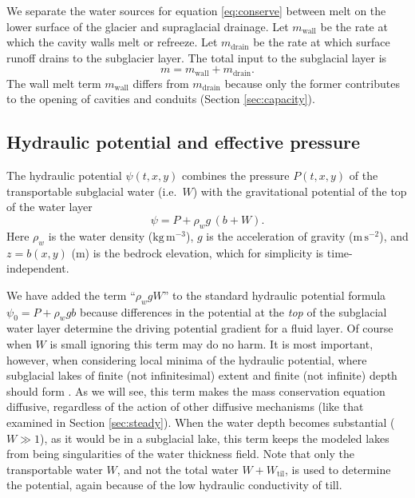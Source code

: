 \documentclass[gmd]{copernicus}   %
\newcommand{\text}{\textrm}
\newcommand{\Wtil}{W_{\text{til}}}
\begin{document}
We separate the water sources for equation \eqref{eq:conserve} between melt on the lower surface of the glacier and supraglacial drainage.  Let $m_{\text{wall}}$ be the rate at which the cavity walls melt or refreeze.  Let $m_{\text{drain}}$ be the rate at which surface runoff drains to the subglacier layer.  The total input to the subglacial layer is
\newcommand{\mwall}{m_{\text{wall}}}
\newcommand{\mdrain}{m_{\text{drain}}}
\begin{equation}
m = \mwall + \mdrain. \label{eq:totalinput}
\end{equation}
The wall melt term $\mwall$ differs from $\mdrain$ because only the former contributes to the opening of cavities and conduits (Section \ref{sec:capacity}).

\subsection{Hydraulic potential and effective pressure}  The  hydraulic potential $\psi(t,x,y)$ combines the pressure $P(t,x,y)$ of the transportable subglacial water (i.e.~$W$) with the gravitational potential of the top of the water layer \citep{Goelleretal2013,Hewittetal2012}
\begin{equation} \label{eq:potential}
\psi = P + \rho_w g\, (b+W).
\end{equation}
Here $\rho_w$ is the water density ($\text{kg}\,\text{m}^{-3}$), $g$ is the acceleration of gravity ($\text{m}\,\text{s}^{-2}$), and $z=b(x,y)$ ($\text{m}$) is the bedrock elevation, which for simplicity is time-independent.

We have added the term ``$\rho_w g W$'' to the standard hydraulic potential formula $\psi_0 = P + \rho_w g b$ \citep{Clarke05,Shreve1972} because differences in the potential at the \emph{top} of the subglacial water layer determine the driving potential gradient for a fluid layer.  Of course when $W$ is small ignoring this term may do no harm.  It is most important, however, when considering local minima of the hydraulic potential, where subglacial lakes of finite (not infinitesimal) extent and finite (not infinite) depth should form \citep[compare][]{Siegertetal2009}.  As we will see, this term makes the mass conservation equation diffusive, regardless of the action of other diffusive mechanisms (like that examined in Section \ref{sec:steady}).  When the water depth becomes substantial ($W\gg 1$), as it would be in a subglacial lake, this term keeps the modeled lakes from being singularities of the water thickness field.  Note that only the transportable water $W$, and not the total water $W+\Wtil$, is used to determine the potential, again because of the low hydraulic conductivity of till.
\end{document}

